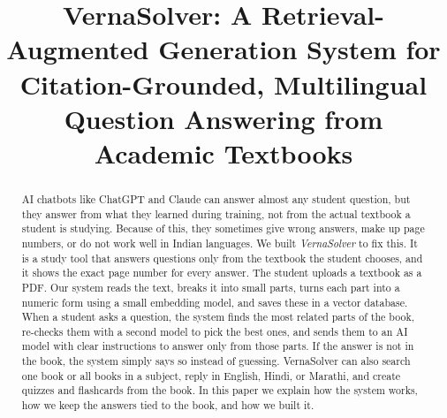 \documentclass[conference]{IEEEtran}
\begin{document}
\title{VernaSolver: A Retrieval-Augmented Generation System for
Citation-Grounded, Multilingual Question Answering from Academic Textbooks}

\author{
\and
{}
\and
{}
}

\maketitle

\begin{abstract}
AI chatbots like ChatGPT and Claude can answer almost any student
question, but they answer from what they learned during training, not
from the actual textbook a student is studying. Because of this, they
sometimes give wrong answers, make up page numbers, or do not work well
in Indian languages. We built \textit{VernaSolver} to fix this. It is a
study tool that answers questions only from the textbook the student
chooses, and it shows the exact page number for every answer. The
student uploads a textbook as a PDF. Our system reads the text, breaks
it into small parts, turns each part into a numeric form using a small
embedding model, and saves these in a vector database. When a student
asks a question, the system finds the most related parts of the book,
re-checks them with a second model to pick the best ones, and sends
them to an AI model with clear instructions to answer only from those
parts. If the answer is not in the book, the system simply says so
instead of guessing. VernaSolver can also search one book or all books
in a subject, reply in English, Hindi, or Marathi, and create quizzes
and flashcards from the book. In this paper we explain how the system
works, how we keep the answers tied to the book, and how we built it.
\end{abstract}
\end{document}
